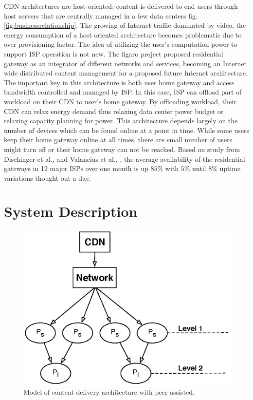 \documentclass[JIP]{ipsj}
\begin{document}
CDN architectures are host-oriented: content is delivered to end users through host servers that are centrally managed in a few data centers fig.\ref{fig:businessrelationship}. 
The growing of Internet traffic dominated by video, the energy consumption of a host oriented architecture becomes problematic due to over provisioning factor.
The idea of utilizing the user's computation power to support ISP operation is not new. 
The figaro project proposed residential gateway as an integrator of different networks and services, becoming an Internet wide distributed content management for a proposed future Internet architecture.  
The important key in this architecture is both user home gateway and access bandwidth controlled and managed by ISP.
In this case, ISP can offload part of workload on their CDN to user's home gateway.  
By offloading workload, their CDN can relax energy demand thus relaxing data center power budget or relaxing capacity planning for power.
This architecture depends largely on the number of devices which can be found online at a point in time.
While some users keep their home gateway online at all times, there are small number of users might turn off or their home gateway can not be reached.
Based on study from Dischinger et al., \cite{Dischinger:2007:CRB:1298306.1298313} and Valancius et al., \cite{valancius2009greening}, the average availability of the residential gateways in 12 major ISPs over one month is up $85\%$ with $5\%$ until $8\%$ uptime variations thought out a day.

\section{System Description}\label{system model}
\begin{figure}[thb]
\begin{center}
\includegraphics[scale=0.6]{graphs/p2p-cdn.eps}
\end{center}
\caption{Model of content delivery architecture with peer assisted.}
\label{fig:iptv}
\end{figure} 
\end{document}
